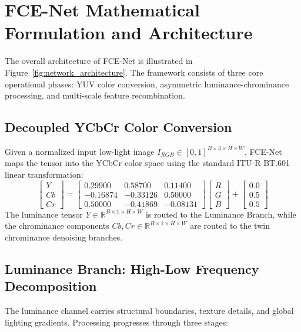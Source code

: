 \documentclass[10pt,twocolumn,letterpaper]{article}
\begin{document}
\section{FCE-Net Mathematical Formulation and Architecture}
The overall architecture of FCE-Net is illustrated in Figure~\ref{fig:network_architecture}. The framework consists of three core operational phases: YUV color conversion, asymmetric luminance-chrominance processing, and multi-scale feature recombination.

\subsection{Decoupled YCbCr Color Conversion}
Given a normalized input low-light image $I_{RGB} \in [0, 1]^{B \times 3 \times H \times W}$, FCE-Net maps the tensor into the YCbCr color space using the standard ITU-R BT.601 linear transformation:
\begin{equation}
\begin{bmatrix}
Y \\ Cb \\ Cr
\end{bmatrix}
=
\begin{bmatrix}
0.29900 & 0.58700 & 0.11400 \\
-0.16874 & -0.33126 & 0.50000 \\
0.50000 & -0.41869 & -0.08131
\end{bmatrix}
\begin{bmatrix}
R \\ G \\ B
\end{bmatrix}
+
\begin{bmatrix}
0.0 \\ 0.5 \\ 0.5
\end{bmatrix}
\label{eq:yuv_transform}
\end{equation}
The luminance tensor $Y \in \mathbb{R}^{B \times 1 \times H \times W}$ is routed to the Luminance Branch, while the chrominance components $Cb, Cr \in \mathbb{R}^{B \times 1 \times H \times W}$ are routed to the twin chrominance denoising branches.

\subsection{Luminance Branch: High-Low Frequency Decomposition}
The luminance channel carries structural boundaries, texture details, and global lighting gradients. Processing progresses through three stages:
\end{document}
